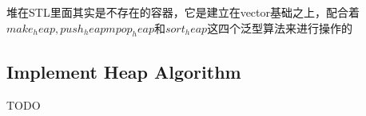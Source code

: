 
\qquad 堆在STL里面其实是不存在的容器，它是建立在vector基础之上，配合着$make_heap, push_heapm pop_heap和sort_heap$这四个泛型算法来进行操作的
    
\subsection{Implement Heap Algorithm}
TODO
%
